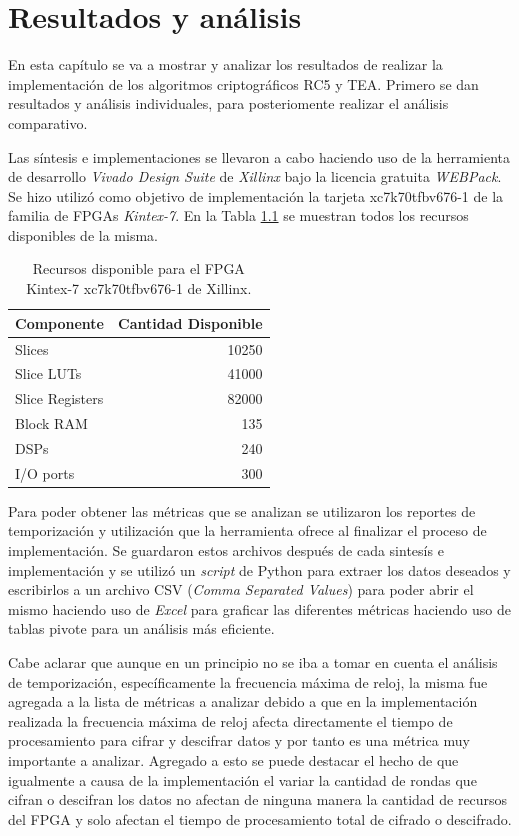 \chapter{Resultados y análisis}
En esta capítulo se va a mostrar y analizar los resultados de realizar la implementación de los algoritmos criptográficos RC5 y TEA.
Primero se dan resultados y análisis individuales, para posteriomente realizar el análisis comparativo.

Las síntesis e implementaciones se llevaron a cabo haciendo uso de la herramienta de desarrollo \textit{Vivado Design Suite} de \textit{Xillinx} bajo la licencia gratuita \textit{WEBPack}. Se hizo utilizó como objetivo de implementación la tarjeta xc7k70tfbv676-1 de la familia de FPGAs \textit{Kintex-7}. En la Tabla \ref{tabRecursosFPGA} se muestran todos los recursos disponibles de la misma. 

\begin{table}[htbp]
  \centering
  \caption{Recursos disponible para el FPGA Kintex-7 xc7k70tfbv676-1 de Xillinx.}
    \begin{tabular}{lr}
    \toprule
    Componente & Cantidad Disponible\\
    \midrule
	Slices & 10250\\
	Slice LUTs & 41000\\
	Slice Registers & 82000\\
	Block RAM & 135\\
	DSPs & 240\\
	I/O ports & 300\\
    \bottomrule
    \end{tabular}%
  \label{tabRecursosFPGA}%
\end{table}%

Para poder obtener las métricas que se analizan se utilizaron los reportes de temporización y utilización que la herramienta ofrece al finalizar el proceso de implementación. Se guardaron estos archivos después de cada sintesís e implementación y se utilizó un \textit{script} de Python para extraer los datos deseados y escribirlos a un archivo CSV (\textit{Comma Separated Values}) para poder abrir el mismo haciendo uso de \textit{Excel} para graficar las diferentes métricas haciendo uso de tablas pivote para un análisis más eficiente.


Cabe aclarar que aunque en un principio no se iba a tomar en cuenta el análisis de temporización, específicamente la frecuencia máxima de reloj, la misma fue agregada a la lista de métricas a analizar debido a que en la implementación realizada la frecuencia máxima de reloj afecta directamente el tiempo de procesamiento para cifrar y descifrar datos y por tanto es una métrica muy importante a analizar. Agregado a esto se puede destacar el hecho de que igualmente a causa de la implementación el variar la cantidad de rondas que cifran o descifran los datos no afectan de ninguna manera la cantidad de recursos del FPGA y solo afectan el tiempo de procesamiento total de cifrado o descifrado.


